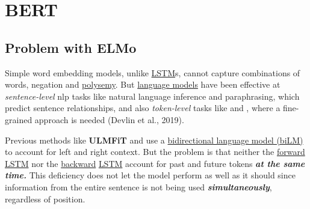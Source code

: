 \section{BERT} \label{sec:BERT}

\subsection{Problem with ELMo} \label{sec:ProblemWithELMo}

Simple word embedding models, unlike \hyperref[sec:LSTM]{LSTM}s, cannot capture combinations of words, negation and \hyperref[sec:Polysemy]{polysemy}. But \hyperref[sec:LanguageModels]{language models} have been effective at \emph{sentence-level} nlp tasks like natural language inference and paraphrasing, which predict sentence relationships, and also \emph{token-level} tasks like  and , where a fine-grained approach is needed (Devlin et al., 2019).   

Previous methods like \textbf{ULMFiT} and  use a \hyperref[sec:BidirectionalLM]{bidirectional language model (biLM)} to account for left and right context. But the problem is that neither the \hyperref[sec:ForwardLM]{forward} \hyperref[sec:LSTM]{LSTM} nor the \hyperref[sec:BackwardLM]{backward} \hyperref[sec:LSTM]{LSTM} account for past and future tokens \textbf{\textit{at the same time.}} This deficiency does not let the model perform as well as it should since information from the entire sentence is not being used \textbf{\textit{simultaneously}}, regardless of position. 


